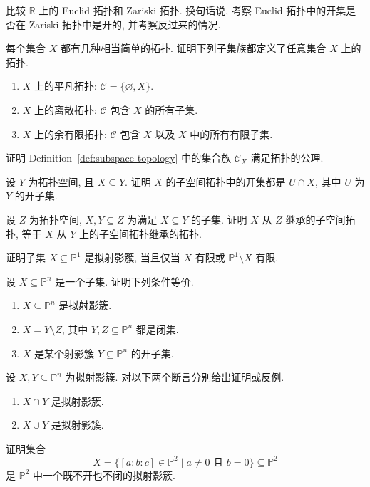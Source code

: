 \BookExerciseHeading
\begin{BookExercises}
  \item\label{ex:compare-euclidean-and-zariski-topologies} 比较 $\mathbb{R}$ 上的 Euclid 拓扑和 Zariski 拓扑. 换句话说, 考察 Euclid 拓扑中的开集是否在 Zariski 拓扑中是开的, 并考察反过来的情况.
  \item\label{ex:trivial-discrete-and-cofinite-topologies} 每个集合 $X$ 都有几种相当简单的拓扑. 证明下列子集族都定义了任意集合 $X$ 上的拓扑.
  \begin{enumerate}
    \item $X$ 上的平凡拓扑: $\mathcal{C}=\{\varnothing,X\}$.
    \item $X$ 上的离散拓扑: $\mathcal{C}$ 包含 $X$ 的所有子集.
    \item $X$ 上的余有限拓扑: $\mathcal{C}$ 包含 $X$ 以及 $X$ 中的所有有限子集.
  \end{enumerate}
  \item\label{ex:subspace-closed-sets-satisfy-topology-axioms} 证明 Definition~\ref{def:subspace-topology} 中的集合族 $\mathcal{C}_{X}$ 满足拓扑的公理.
  \item\label{ex:open-sets-in-subspace-topology} 设 $Y$ 为拓扑空间, 且 $X\subseteq Y$. 证明 $X$ 的子空间拓扑中的开集都是 $U\cap X$, 其中 $U$ 为 $Y$ 的开子集.
  \item\label{ex:subspace-topology-transitive-under-inclusion} 设 $Z$ 为拓扑空间, $X,Y\subseteq Z$ 为满足 $X\subseteq Y$ 的子集. 证明 $X$ 从 $Z$ 继承的子空间拓扑, 等于 $X$ 从 $Y$ 上的子空间拓扑继承的拓扑.
  \item\label{ex:characterize-quasiprojective-subsets-of-projective-line} 证明子集 $X\subseteq\mathbb{P}^{1}$ 是拟射影簇, 当且仅当 $X$ 有限或 $\mathbb{P}^{1}\setminus X$ 有限.
  \item\label{ex:equivalent-quasiprojective-variety-definitions} 设 $X\subseteq\mathbb{P}^{n}$ 是一个子集. 证明下列条件等价.
  \begin{enumerate}[label=(\roman*)]
    \item $X\subseteq\mathbb{P}^{n}$ 是拟射影簇.
    \item $X=Y\setminus Z$, 其中 $Y,Z\subseteq\mathbb{P}^{n}$ 都是闭集.
    \item $X$ 是某个射影簇 $Y\subseteq\mathbb{P}^{n}$ 的开子集.
  \end{enumerate}
  \item\label{ex:unions-and-intersections-of-quasiprojective-varieties} 设 $X,Y\subseteq\mathbb{P}^{n}$ 为拟射影簇. 对以下两个断言分别给出证明或反例.
  \begin{enumerate}
    \item $X\cap Y$ 是拟射影簇.
    \item $X\cup Y$ 是拟射影簇.
  \end{enumerate}
  \item\label{ex:quasiprojective-variety-neither-open-nor-closed} 证明集合
  \[
    X=\{[a:b:c]\in\mathbb{P}^{2}\mid a\ne0\text{ 且 }b=0\}\subseteq\mathbb{P}^{2}
  \]
  是 $\mathbb{P}^{2}$ 中一个既不开也不闭的拟射影簇.
\end{BookExercises}
